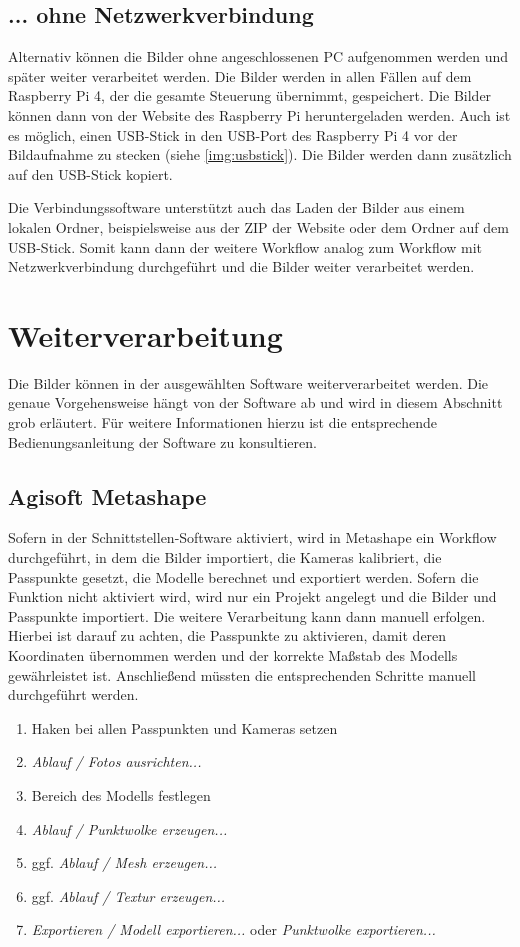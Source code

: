 \documentclass[./00PhotoBox.tex]{subfiles}
\begin{document}
\subsection{... ohne Netzwerkverbindung}
Alternativ können die Bilder ohne angeschlossenen PC aufgenommen werden und später weiter verarbeitet werden. Die Bilder werden in allen Fällen auf dem Raspberry Pi 4, der die gesamte Steuerung übernimmt, gespeichert. Die Bilder können dann von der Website des Raspberry Pi heruntergeladen werden. Auch ist es möglich, einen USB-Stick in den USB-Port des Raspberry Pi 4 vor der Bildaufnahme zu stecken (siehe \autoref{img:usbstick}). Die Bilder werden dann zusätzlich auf den USB-Stick kopiert.

Die Verbindungssoftware unterstützt auch das Laden der Bilder aus einem lokalen Ordner, beispielsweise aus der ZIP der Website oder dem Ordner auf dem USB-Stick. Somit kann dann der weitere Workflow analog zum Workflow mit Netzwerkverbindung durchgeführt und die Bilder weiter verarbeitet werden.

\section{Weiterverarbeitung}
Die Bilder können in der ausgewählten Software weiterverarbeitet werden. Die genaue Vorgehensweise hängt von der Software ab und wird in diesem Abschnitt grob erläutert. Für weitere Informationen hierzu ist die entsprechende Bedienungsanleitung der Software zu konsultieren.

\subsection{Agisoft Metashape}
Sofern in der Schnittstellen-Software aktiviert, wird in Metashape ein Workflow durchgeführt, in dem die Bilder importiert, die Kameras kalibriert, die Passpunkte gesetzt, die Modelle berechnet und exportiert werden. Sofern die Funktion nicht aktiviert wird, wird nur ein Projekt angelegt und die Bilder und Passpunkte importiert. Die weitere Verarbeitung kann dann manuell erfolgen. Hierbei ist darauf zu achten, die Passpunkte zu aktivieren, damit deren Koordinaten übernommen werden und der korrekte Maßstab des Modells gewährleistet ist. Anschließend müssten die entsprechenden Schritte manuell durchgeführt werden.

\begin{enumerate}
    \item Haken bei allen Passpunkten und Kameras setzen
    \item \textit{Ablauf / Fotos ausrichten...}
    \item Bereich des Modells festlegen
    \item \textit{Ablauf / Punktwolke erzeugen...}
    \item ggf. \textit{Ablauf / Mesh erzeugen...}
    \item ggf. \textit{Ablauf / Textur erzeugen...}
    \item \textit{Exportieren / Modell exportieren...} oder \textit{Punktwolke exportieren...}
\end{enumerate}
\end{document}
